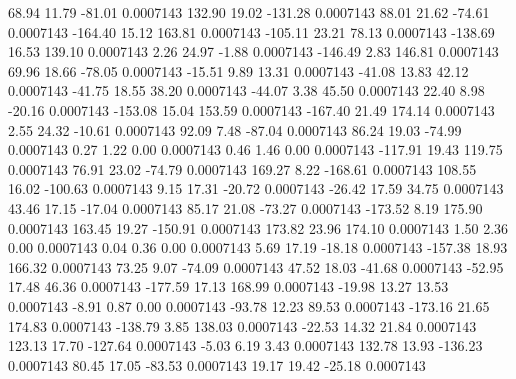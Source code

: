        68.94       11.79      -81.01     0.0007143
      132.90       19.02     -131.28     0.0007143
       88.01       21.62      -74.61     0.0007143
     -164.40       15.12      163.81     0.0007143
     -105.11       23.21       78.13     0.0007143
     -138.69       16.53      139.10     0.0007143
        2.26       24.97       -1.88     0.0007143
     -146.49        2.83      146.81     0.0007143
       69.96       18.66      -78.05     0.0007143
      -15.51        9.89       13.31     0.0007143
      -41.08       13.83       42.12     0.0007143
      -41.75       18.55       38.20     0.0007143
      -44.07        3.38       45.50     0.0007143
       22.40        8.98      -20.16     0.0007143
     -153.08       15.04      153.59     0.0007143
     -167.40       21.49      174.14     0.0007143
        2.55       24.32      -10.61     0.0007143
       92.09        7.48      -87.04     0.0007143
       86.24       19.03      -74.99     0.0007143
        0.27        1.22        0.00     0.0007143
        0.46        1.46        0.00     0.0007143
     -117.91       19.43      119.75     0.0007143
       76.91       23.02      -74.79     0.0007143
      169.27        8.22     -168.61     0.0007143
      108.55       16.02     -100.63     0.0007143
        9.15       17.31      -20.72     0.0007143
      -26.42       17.59       34.75     0.0007143
       43.46       17.15      -17.04     0.0007143
       85.17       21.08      -73.27     0.0007143
     -173.52        8.19      175.90     0.0007143
      163.45       19.27     -150.91     0.0007143
      173.82       23.96      174.10     0.0007143
        1.50        2.36        0.00     0.0007143
        0.04        0.36        0.00     0.0007143
        5.69       17.19      -18.18     0.0007143
     -157.38       18.93      166.32     0.0007143
       73.25        9.07      -74.09     0.0007143
       47.52       18.03      -41.68     0.0007143
      -52.95       17.48       46.36     0.0007143
     -177.59       17.13      168.99     0.0007143
      -19.98       13.27       13.53     0.0007143
       -8.91        0.87        0.00     0.0007143
      -93.78       12.23       89.53     0.0007143
     -173.16       21.65      174.83     0.0007143
     -138.79        3.85      138.03     0.0007143
      -22.53       14.32       21.84     0.0007143
      123.13       17.70     -127.64     0.0007143
       -5.03        6.19        3.43     0.0007143
      132.78       13.93     -136.23     0.0007143
       80.45       17.05      -83.53     0.0007143
       19.17       19.42      -25.18     0.0007143

